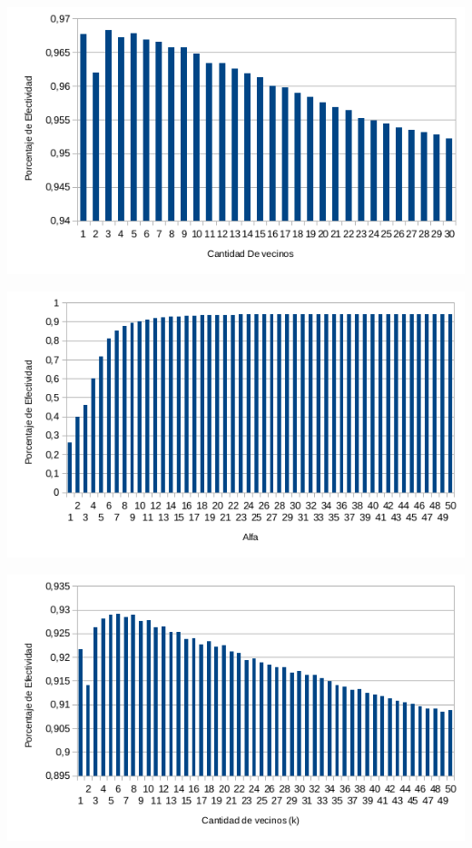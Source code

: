 \begin{center}
\includegraphics[scale=0.6]{nuevosResultados/testeokPCA.png}\\
\end{center}

\begin{center}
\includegraphics[scale=0.6]{nuevosResultados/alfaconk=3.png}\\
\end{center}

\begin{center}
\includegraphics[scale=0.6]{nuevosResultados/testeokparapcaconalfa=13.png}\\
\end{center}
